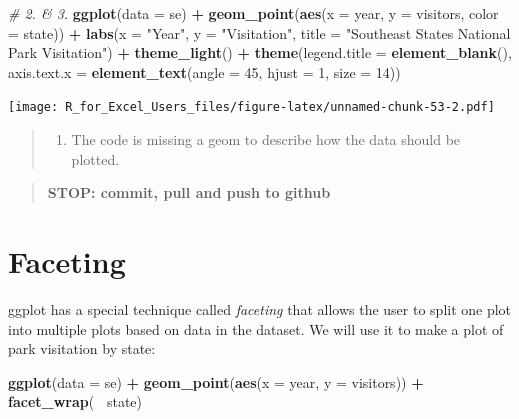 \documentclass[]{book}
\newenvironment{Shaded}{\begin{snugshade}}{\end{snugshade}}
\newcommand{\CommentTok}[1]{\textcolor[rgb]{0.56,0.35,0.01}{\textit{#1}}}
\newcommand{\DataTypeTok}[1]{\textcolor[rgb]{0.13,0.29,0.53}{#1}}
\newcommand{\DecValTok}[1]{\textcolor[rgb]{0.00,0.00,0.81}{#1}}
\newcommand{\KeywordTok}[1]{\textcolor[rgb]{0.13,0.29,0.53}{\textbf{#1}}}
\newcommand{\NormalTok}[1]{#1}
\newcommand{\OperatorTok}[1]{\textcolor[rgb]{0.81,0.36,0.00}{\textbf{#1}}}
\newcommand{\StringTok}[1]{\textcolor[rgb]{0.31,0.60,0.02}{#1}}
\providecommand{\tightlist}{%
  \setlength{\itemsep}{0pt}\setlength{\parskip}{0pt}}
\begin{document}
\begin{Shaded}
\begin{Highlighting}[]
\CommentTok{# 2. & 3.}
\KeywordTok{ggplot}\NormalTok{(}\DataTypeTok{data =}\NormalTok{ se) }\OperatorTok{+}
\StringTok{  }\KeywordTok{geom_point}\NormalTok{(}\KeywordTok{aes}\NormalTok{(}\DataTypeTok{x =}\NormalTok{ year, }\DataTypeTok{y =}\NormalTok{ visitors, }\DataTypeTok{color =}\NormalTok{ state)) }\OperatorTok{+}
\StringTok{  }\KeywordTok{labs}\NormalTok{(}\DataTypeTok{x =} \StringTok{"Year"}\NormalTok{,}
       \DataTypeTok{y =} \StringTok{"Visitation"}\NormalTok{,}
       \DataTypeTok{title =} \StringTok{"Southeast States National Park Visitation"}\NormalTok{) }\OperatorTok{+}
\StringTok{  }\KeywordTok{theme_light}\NormalTok{() }\OperatorTok{+}
\StringTok{  }\KeywordTok{theme}\NormalTok{(}\DataTypeTok{legend.title =} \KeywordTok{element_blank}\NormalTok{(),}
        \DataTypeTok{axis.text.x =} \KeywordTok{element_text}\NormalTok{(}\DataTypeTok{angle =} \DecValTok{45}\NormalTok{, }\DataTypeTok{hjust =} \DecValTok{1}\NormalTok{, }\DataTypeTok{size =} \DecValTok{14}\NormalTok{))}
\end{Highlighting}
\end{Shaded}

\texttt{[image: R\_for\_Excel\_Users\_files/figure-latex/unnamed-chunk-53-2.pdf]}

\begin{quote}
\begin{enumerate}
\def\labelenumi{\arabic{enumi}.}
\setcounter{enumi}{3}
\tightlist
\item
  The code is missing a geom to describe how the data should be plotted.
\end{enumerate}
\end{quote}

\begin{quote}
\textbf{STOP: commit, pull and push to github}
\end{quote}

\hypertarget{faceting}{%
\section{Faceting}\label{faceting}}

ggplot has a special technique called \emph{faceting} that allows the user to split one plot into multiple plots based on data in the dataset. We will use it to make a plot of park visitation by state:

\begin{Shaded}
\begin{Highlighting}[]
\KeywordTok{ggplot}\NormalTok{(}\DataTypeTok{data =}\NormalTok{ se) }\OperatorTok{+}
\StringTok{    }\KeywordTok{geom_point}\NormalTok{(}\KeywordTok{aes}\NormalTok{(}\DataTypeTok{x =}\NormalTok{ year, }\DataTypeTok{y =}\NormalTok{ visitors)) }\OperatorTok{+}
\StringTok{    }\KeywordTok{facet_wrap}\NormalTok{(}\OperatorTok{~}\StringTok{ }\NormalTok{state)}
\end{Highlighting}
\end{Shaded}
\end{document}
